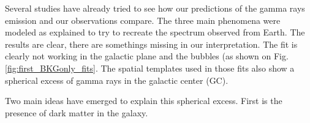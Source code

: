 Several studies have already tried to see how our predictions of the gamma rays emission and our observations compare. The three main phenomena were modeled as explained to try to recreate the spectrum observed from Earth. The results are clear, there are somethings missing in our interpretation. 
The fit is clearly not working in the galactic plane and the bubbles (as shown on Fig. \ref{fig:first_BKGonly_fits}. The spatial templates used in those fits also show a spherical excess of gamma rays in the galactic center (GC). 

Two main ideas have emerged to explain this spherical excess. 
First is the presence of dark matter in the galaxy.








